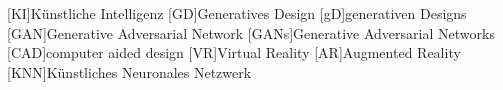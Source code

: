 \begin{acronym}
  [KI]{Künstliche Intelligenz}
  [GD]{Generatives Design }
  [gD]{generativen Designs}
  [GAN]{Generative Adversarial Network}
  [GANs]{Generative Adversarial Networks}
  [CAD]{computer aided design}
  [VR]{Virtual Reality}
  [AR]{Augmented Reality}
  [KNN]{Künstliches Neuronales Netzwerk}
\end{acronym}